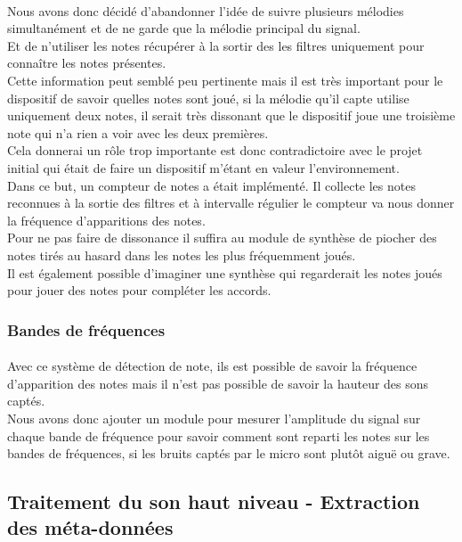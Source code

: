 \documentclass[a4paper, titlepage, oneside, 12pt]{article}%
\begin{document}
\paragraph{}
Nous avons donc décidé d'abandonner l'idée de suivre plusieurs mélodies simultanément et de ne garde que la mélodie principal du signal. \\
Et de n’utiliser les notes récupérer à la sortir des les filtres uniquement pour connaître les notes présentes.\\
Cette information peut semblé peu pertinente mais il est très important pour le dispositif de savoir quelles notes sont joué, si la mélodie qu'il capte utilise uniquement deux notes, il serait très dissonant que le dispositif joue une troisième note qui n'a rien a voir avec les deux premières.\\ Cela donnerai un rôle trop importante est donc contradictoire avec le projet initial qui était de faire un dispositif m’étant en valeur l’environnement.\\
Dans ce but, un compteur de notes a était implémenté. Il collecte les notes reconnues à la sortie des filtres et à intervalle régulier le compteur va nous donner la fréquence d’apparitions des notes.\\
Pour ne pas faire de dissonance il suffira au module de synthèse de piocher des notes tirés au hasard dans les notes les plus fréquemment joués.\\
Il est également possible d'imaginer une synthèse qui regarderait les notes joués pour jouer des notes pour compléter les accords.

\subsubsection{Bandes de fréquences}
\paragraph{}
Avec ce système de détection de note, ils est possible de savoir la fréquence d'apparition des notes mais il n'est pas possible de savoir la hauteur des sons captés.\\
Nous avons donc ajouter un module pour mesurer l'amplitude du signal sur chaque bande de fréquence pour savoir comment sont reparti les notes sur les bandes de fréquences, si les bruits captés par le micro sont plutôt aiguë ou grave.

\subsection{Traitement du son haut niveau - Extraction des méta-données}
\end{document}
